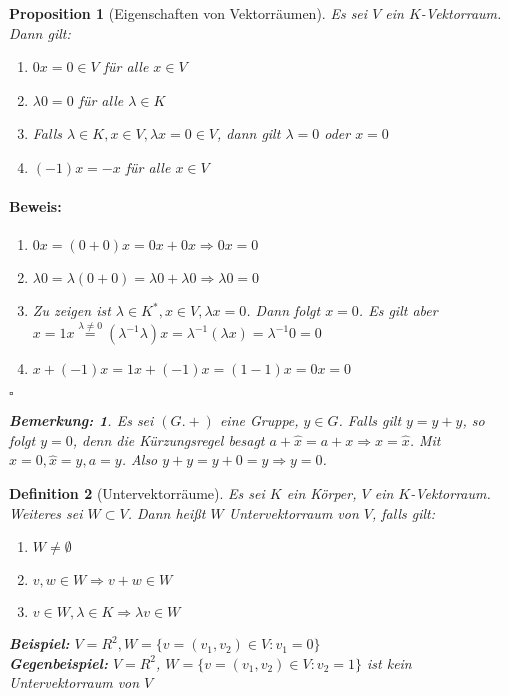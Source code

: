 \documentclass{report}
\newcommand{\IN}[1]{\index{#1|BH}}
\newcommand{\lb}{\lambda}
\theoremstyle{customrem}
\newtheorem*{bem}{Bemerkung\textnormal:}
\theoremstyle{customdef}
\newtheorem{definition}{Definition}[chapter]
\newtheorem{proposition}[definition]{Proposition}
\renewenvironment{proof}{\vspace{-.75cm}\paragraph{Beweis: }}{\vspace{-.5cm}\hfill$\square$}
\begin{document}
	\begin{proposition}[Eigenschaften von Vektorräumen]
		Es sei $V$ ein $K$-Vektorraum. Dann gilt:
		\begin{enumerate}[leftmargin=4cm]
			\itemsep0cm
			\item $0 x = 0 \in V$ für alle $x \in V$
			\item $\lb 0 = 0$ für alle $\lb \in K$
			\item Falls $\lb \in K, x \in V, \lb x = 0 \in V$, dann gilt $\lb = 0$ oder $x = 0$
			\item $(-1) x = -x$ für alle $x \in V$
		\end{enumerate}
		\begin{proof}
			\begin{enumerate}
				\itemsep0cm
				\item $0 x = (0 + 0)x = 0x + 0x \Rightarrow 0x = 0$
				\item $\lb 0 = \lb(0 + 0) = \lb 0 + \lb 0 \Rightarrow \lb 0 = 0$
				\item Zu zeigen ist $\lb \in K^\ast, x \in V, \lb x = 0$. Dann folgt $x = 0$. Es gilt aber $x = 1 x \overset{\lb \neq 0}{=} (\lb ^{-1} \lb) x = \lb^{-1}(\lb x) = \lb^{-1} 0 = 0$
				\item $x + (-1) x = 1x + (-1) x = (1 - 1)  x = 0 x = 0$
			\end{enumerate}
		\end{proof}
		\begin{bem}
			Es sei $(G. +)$ eine Gruppe, $y \in G$. Falls gilt $y = y + y$, so folgt $y = 0$, denn die Kürzungsregel besagt $a + \hat{x} = a+x \Rightarrow x = \hat{x}$. Mit $x = 0, \hat{x} = y, a = y$. Also $y +y = y + 0 = y \Rightarrow y = 0$.
		\end{bem}
	\end{proposition}

	\begin{definition}[Untervektorräume]
		\IN{Vektorraum!Unter-}
		Es sei $K$ ein Körper, $V$ ein $K$-Vektorraum. Weiteres sei $W \subset V$. Dann heißt $W$ Untervektorraum von $V$, falls gilt:
		
		\begin{enumerate}[leftmargin=4cm]
			\itemsep0cm
			\item $W \neq \emptyset$ 
			\item $v, w \in W \Rightarrow v + w \in W$
			\item $v \in W, \lb \in K \Rightarrow \lb v \in W$
		\end{enumerate}
		
		\noindent\textbf{Beispiel:}
		$V = R^2, W = \{v = (v_1, v_2) \in V : v_1 = 0\}$\\
		\textbf{Gegenbeispiel:}
		$V = R^2$, $W = \{v = (v_1, v_2) \in V : v_2 = 1\}$ ist kein Untervektorraum von $V$
	\end{definition}
	
\end{document}
